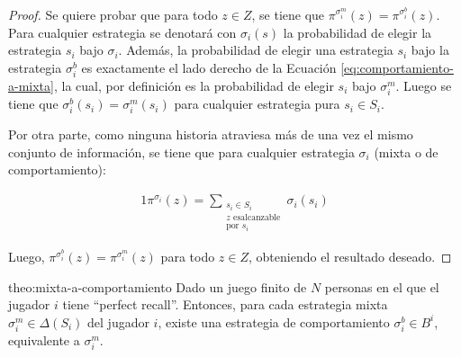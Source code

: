 \begin{proof}
Se quiere probar que para todo $z \in Z$, se tiene que $\pi^{\sigma^m_i}(z) = \pi^{\sigma^b_i}(z)$. 
Para cualquier estrategia se denotará con $\sigma_i(s)$ la probabilidad de elegir la estrategia $s_i$ bajo $\sigma_i$. Además, la probabilidad de elegir una estrategia $s_i$ bajo la estrategia $\sigma^b_i$ es exactamente el lado derecho de la Ecuación \ref{eq:comportamiento-a-mixta}, la cual, por definición es la probabilidad de elegir $s_i$ bajo $\sigma^m_i$. Luego se tiene que $\sigma_i^b(s_i) = \sigma_i^m(s_i)$ para cualquier estrategia pura $s_i \in S_i$.

Por otra parte, como ninguna historia atraviesa más de una vez el mismo conjunto de información, se tiene que para cualquier estrategia $\sigma_i$ (mixta o de comportamiento):

\begin{alignat}{1}
\label{eq:definicion-mixta}
\pi^{\sigma_i}(z) = \sum_{\substack{s_i \in S_i \\  z \text{ es} \text{alcanzable} \\ \text{por } s_i} } \sigma_i(s_i)
\end{alignat}

Luego, $\pi^{\sigma_i^b}(z) = \pi^{\sigma_i^m}(z)$ para todo $z \in Z$, obteniendo el resultado deseado. 
\end{proof}


\begin{reptheorem}{theo:mixta-a-comportamiento}
Dado un juego finito de $N$ personas en el que el jugador $i$ tiene ``perfect recall''. Entonces, para cada estrategia mixta $\sigma^m_i \in \Delta(S_i)$ del jugador $i$, existe una estrategia de comportamiento $\sigma^b_i \in B^i$, equivalente a $\sigma^m_i$.
\end{reptheorem}

